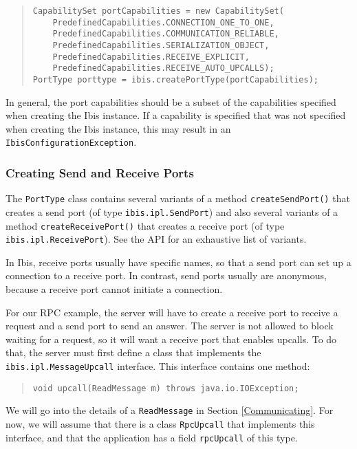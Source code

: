\documentclass[10pt]{article}
\begin{document}
{\small
\begin{quote}
\begin{verbatim}
CapabilitySet portCapabilities = new CapabilitySet(
    PredefinedCapabilities.CONNECTION_ONE_TO_ONE,
    PredefinedCapabilities.COMMUNICATION_RELIABLE,
    PredefinedCapabilities.SERIALIZATION_OBJECT,
    PredefinedCapabilities.RECEIVE_EXPLICIT,
    PredefinedCapabilities.RECEIVE_AUTO_UPCALLS);
PortType porttype = ibis.createPortType(portCapabilities);
\end{verbatim}
\end{quote}
}
\noindent
In general, the port capabilities should be a subset of the capabilities
specified when creating the Ibis instance. If a capability
is specified that was not specified when creating the Ibis instance,
this may result in an \texttt{IbisConfigurationException}.

\subsubsection{Creating Send and Receive Ports}

The \texttt{PortType} class contains several variants of a method
\texttt{createSendPort()} that creates a send port (of type
\texttt{ibis.ipl.SendPort}) and
also several variants of a method \texttt{createReceivePort()} that
creates a receive port (of type \texttt{ibis.ipl.ReceivePort}).
See the API for an exhaustive list of variants.

In Ibis, receive ports usually have specific names, so that
a send port can set up a connection to a receive port. In contrast,
send ports usually are anonymous, because a receive port cannot
initiate a connection.

For our RPC example, the server will have to create a receive port
to receive a request and a send port to send an answer.
The server is not allowed to block waiting for a request, so it will
want a receive port that enables upcalls.
To do that, the server must first define a class that implements
the \texttt{ibis.ipl.MessageUpcall} interface. This interface contains one
method:

{\small
\begin{quote}
\begin{verbatim}
void upcall(ReadMessage m) throws java.io.IOException;
\end{verbatim}
\end{quote}
}

We will go into the details of a \texttt{ReadMessage} in Section
\ref{Communicating}. For now, we will assume that there is a
class \texttt{RpcUpcall} that implements this interface, and
that the application has a field \texttt{rpcUpcall} of this type.
\end{document}
